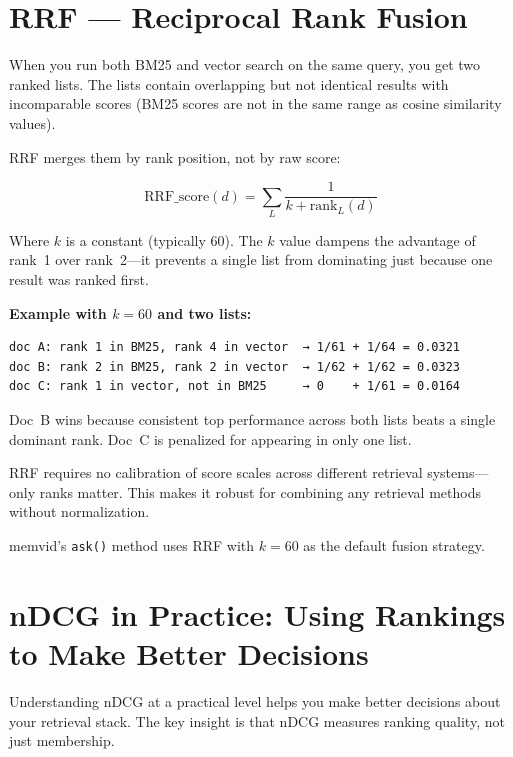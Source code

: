 \section{RRF --- Reciprocal Rank Fusion}

When you run both BM25 and vector search on the same query, you get two ranked lists. The
lists contain overlapping but not identical results with incomparable scores (BM25 scores are
not in the same range as cosine similarity values).

RRF merges them by rank position, not by raw score:

\[
\text{RRF\_score}(d) = \sum_{L} \frac{1}{k + \text{rank}_L(d)}
\]

Where $k$ is a constant (typically 60). The $k$ value dampens the advantage of rank~1 over
rank~2---it prevents a single list from dominating just because one result was ranked first.

\textbf{Example with $k=60$ and two lists:}

\begin{Verbatim}
doc A: rank 1 in BM25, rank 4 in vector  → 1/61 + 1/64 = 0.0321
doc B: rank 2 in BM25, rank 2 in vector  → 1/62 + 1/62 = 0.0323
doc C: rank 1 in vector, not in BM25     → 0    + 1/61 = 0.0164
\end{Verbatim}

Doc~B wins because consistent top performance across both lists beats a single dominant rank.
Doc~C is penalized for appearing in only one list.

RRF requires no calibration of score scales across different retrieval systems---only ranks
matter. This makes it robust for combining any retrieval methods without normalization.

memvid's \texttt{ask()} method uses RRF with $k=60$ as the default fusion strategy.

\section{nDCG in Practice: Using Rankings to Make Better Decisions}

Understanding nDCG at a practical level helps you make better decisions about your retrieval
stack. The key insight is that nDCG measures ranking quality, not just membership.

